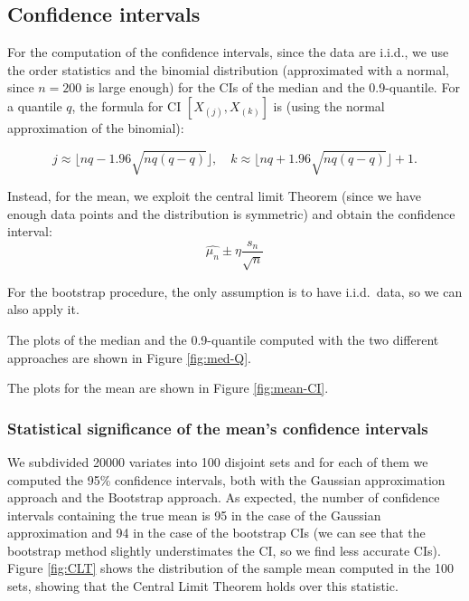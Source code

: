 \documentclass[a4paper,12pt]{article}
\begin{document}
\subsection*{Confidence intervals}
For the computation of the confidence intervals, since the data are i.i.d., we use the order statistics and the binomial distribution (approximated with a normal, since $n=200$ is large enough) for the CIs of the median and the 0.9-quantile.
For a quantile $q$, the formula for CI $[X_{(j)},X_{(k)}]$ is (using the normal approximation of the binomial):

\begin{equation*}
  j \approx \lfloor nq-1.96\sqrt{nq(q-q)} \rfloor, \quad k \approx \lfloor nq+1.96\sqrt{nq(q-q)} \rfloor +1.
\end{equation*}

Instead, for the mean, we exploit the central limit Theorem (since we have enough data points and the distribution is symmetric) and obtain the confidence interval:
\begin{equation*}
  \hat{\mu_n} \pm \eta\frac{s_n}{\sqrt{n}}
\end{equation*}

For the bootstrap procedure, the only assumption is to have i.i.d.\ data, so we can also apply it.

The plots of the median and the 0.9-quantile computed with the two different approaches are shown in Figure \ref{fig:med-Q}.

The plots for the mean are shown in Figure \ref{fig:mean-CI}.

\subsubsection*{Statistical significance of the mean's confidence intervals}

We subdivided 20000 variates into 100 disjoint sets and for each of them we computed the 95\% confidence intervals, both with the Gaussian approximation approach and the Bootstrap approach. As expected, the number of confidence intervals containing the true mean is 95 in the case of the Gaussian approximation and 94 in the case of the bootstrap CIs (we can see that the bootstrap method slightly understimates the CI, so we find less accurate CIs). Figure \ref{fig:CLT} shows the distribution of the sample mean computed in the 100 sets, showing that the Central Limit Theorem holds over this statistic.
\end{document}
